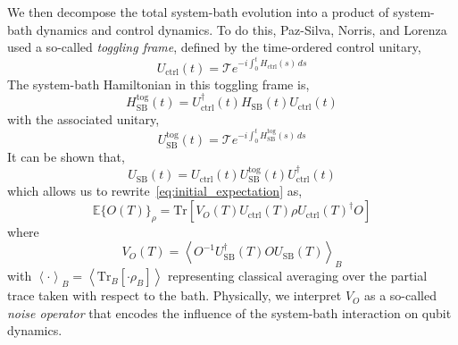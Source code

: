 \documentclass[12pt]{iopart}
\begin{document}
We then decompose the total system-bath evolution into a product of system-bath dynamics and control dynamics. To do this, Paz-Silva, Norris, and Lorenza~\cite{paz2017multiqubit} used a so-called \textit{toggling frame}, defined by the time-ordered control unitary,
\begin{equation} \label{eq:control_unitary_construction}
 U_{\mathrm{ctrl}}(t)=\mathcal{T} e^{-i \int_0^t H_{\mathrm{ctrl}}(s) \, ds}
\end{equation}
The system-bath Hamiltonian in this toggling frame is,
\begin{equation}\label{eq:interaction_hamiltonian}
 H_{\mathrm{SB}}^{\mathrm{tog}}(t) = U_{\mathrm{ctrl}}^{\dagger}(t) H_{\mathrm{SB}}(t) U_{\mathrm{ctrl}}(t)
\end{equation}
with the associated unitary,
\begin{equation}\label{eq:interaction_unitary}
 U_{\mathrm{SB}}^{\mathrm{tog}}(t)=\mathcal{T} e^{-i \int_0^t H_{\mathrm{SB}}^{\mathrm{tog}}(s) \, ds}
\end{equation}
It can be shown that,
\begin{equation}\label{eq:final_interaction_unitary}
 {U}_{\mathrm{SB}}(t)=U_{\mathrm{ctrl}}(t)  U_{\mathrm{SB}}^{\mathrm{tog}}(t) U_{\mathrm{ctrl}}^{\dagger}(t)
\end{equation}
which allows us to rewrite~\cref{eq:initial_expectation} as,
\begin{equation} \label{eq:expectation_with_noise}
 \mathbb{E}\{O(T)\}_\rho=\mathrm{Tr}\left[V_O(T) U_{\mathrm{ctrl}}(T) \rho U_{\mathrm{ctrl}}(T)^{\dagger} O\right]
\end{equation}
where
\begin{equation} \label{eq:VO_construction}
 V_{O}(T)=\left\langle O^{-1} {U}_{\mathrm{SB}}^{\dagger}(T) O {U}_{\mathrm{SB}}(T)\right\rangle_{B}
\end{equation}
with $\left\langle \cdot \right\rangle_{B}=\left\langle\mathrm{Tr}_{B}\left[\cdot \rho_{B}\right]\right\rangle$ representing classical averaging over the partial trace taken with respect to the bath. Physically, we interpret $V_{O}$ as a so-called \textit{noise operator} that encodes the influence of the system-bath interaction on qubit dynamics.
\end{document}
